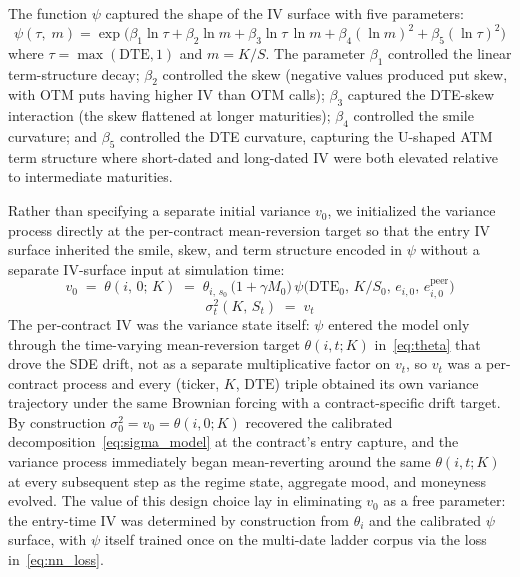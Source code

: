 The function $\psi$ captured the shape of the IV surface with five parameters:
\begin{equation}\label{eq:psi}
    \psi(\tau,\; m) = \exp\!\Big(\beta_1 \ln\tau + \beta_2 \ln m + \beta_3 \ln\tau\,\ln m + \beta_4 (\ln m)^2 + \beta_5 (\ln\tau)^2\Big)
\end{equation}
where $\tau = \max(\mathrm{DTE}, 1)$ and $m = K/S$. The parameter $\beta_1$ controlled the linear term-structure decay; $\beta_2$ controlled the skew (negative values produced put skew, with OTM puts having higher IV than OTM calls); $\beta_3$ captured the DTE-skew interaction (the skew flattened at longer maturities); $\beta_4$ controlled the smile curvature; and $\beta_5$ controlled the DTE curvature, capturing the U-shaped ATM term structure where short-dated and long-dated IV were both elevated relative to intermediate maturities.

Rather than specifying a separate initial variance $v_0$, we initialized the variance process directly at the per-contract mean-reversion target so that the entry IV surface inherited the smile, skew, and term structure encoded in $\psi$ without a separate IV-surface input at simulation time:
\begin{equation}\label{eq:v0}
    v_0 \;=\; \theta(i,\,0;\,K) \;=\; \theta_{i,\,s_0}\,\bigl(1+\gamma M_0\bigr)\,\psi\bigl(\mathrm{DTE}_0,\, K/S_0,\, e_{i,0},\, e^{\text{peer}}_{i,0}\bigr)
\end{equation}
\begin{equation}\label{eq:sigma_path}
    \sigma_t^2(K,\, S_t) \;=\; v_t
\end{equation}
The per-contract IV was the variance state itself: $\psi$ entered the model only through the time-varying mean-reversion target $\theta(i,t;K)$ in~\eqref{eq:theta} that drove the SDE drift, not as a separate multiplicative factor on $v_t$, so $v_t$ was a per-contract process and every (ticker, $K$, $\mathrm{DTE}$) triple obtained its own variance trajectory under the same Brownian forcing with a contract-specific drift target. By construction $\sigma_0^2 = v_0 = \theta(i,0;K)$ recovered the calibrated decomposition~\eqref{eq:sigma_model} at the contract's entry capture, and the variance process immediately began mean-reverting around the same $\theta(i,t;K)$ at every subsequent step as the regime state, aggregate mood, and moneyness evolved. The value of this design choice lay in eliminating $v_0$ as a free parameter: the entry-time IV was determined by construction from $\theta_i$ and the calibrated $\psi$ surface, with $\psi$ itself trained once on the multi-date ladder corpus via the loss in~\eqref{eq:nn_loss}.

